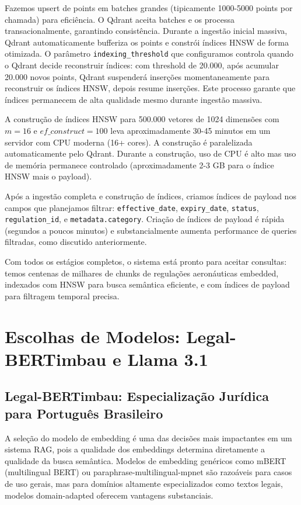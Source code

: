 \documentclass[12pt,a4paper]{article}
\begin{document}
Fazemos upsert de points em batches grandes (tipicamente 1000-5000 points por chamada) para eficiência. O Qdrant aceita batches e os processa transacionalmente, garantindo consistência. Durante a ingestão inicial massiva, Qdrant automaticamente bufferiza os points e constrói índices HNSW de forma otimizada. O parâmetro \texttt{indexing\_threshold} que configuramos controla quando o Qdrant decide reconstruir índices: com threshold de 20.000, após acumular 20.000 novos points, Qdrant suspenderá inserções momentaneamente para reconstruir os índices HNSW, depois resume inserções. Este processo garante que índices permanecem de alta qualidade mesmo durante ingestão massiva.

A construção de índices HNSW para 500.000 vetores de 1024 dimensões com $m=16$ e $ef\_construct=100$ leva aproximadamente 30-45 minutos em um servidor com CPU moderna (16+ cores). A construção é paralelizada automaticamente pelo Qdrant. Durante a construção, uso de CPU é alto mas uso de memória permanece controlado (aproximadamente 2-3 GB para o índice HNSW mais o payload).

Após a ingestão completa e construção de índices, criamos índices de payload nos campos que planejamos filtrar: \texttt{effective\_date}, \texttt{expiry\_date}, \texttt{status}, \texttt{regulation\_id}, e \texttt{metadata.category}. Criação de índices de payload é rápida (segundos a poucos minutos) e substancialmente aumenta performance de queries filtradas, como discutido anteriormente.

Com todos os estágios completos, o sistema está pronto para aceitar consultas: temos centenas de milhares de chunks de regulações aeronáuticas embedded, indexados com HNSW para busca semântica eficiente, e com índices de payload para filtragem temporal precisa.

\section{Escolhas de Modelos: Legal-BERTimbau e Llama 3.1}

\subsection{Legal-BERTimbau: Especialização Jurídica para Português Brasileiro}

A seleção do modelo de embedding é uma das decisões mais impactantes em um sistema RAG, pois a qualidade dos embeddings determina diretamente a qualidade da busca semântica. Modelos de embedding genéricos como mBERT (multilingual BERT) ou paraphrase-multilingual-mpnet são razoáveis para casos de uso gerais, mas para domínios altamente especializados como textos legais, modelos domain-adapted oferecem vantagens substanciais.
\end{document}
